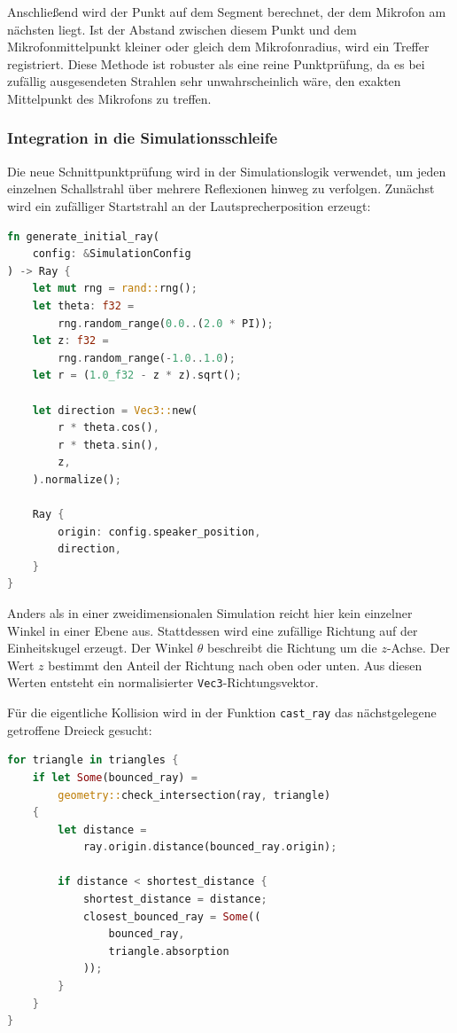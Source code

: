 Anschließend wird der Punkt auf dem Segment berechnet, der dem Mikrofon am
nächsten liegt. Ist der Abstand zwischen diesem Punkt und dem
Mikrofonmittelpunkt kleiner oder gleich dem Mikrofonradius, wird ein Treffer
registriert. Diese Methode ist robuster als eine reine Punktprüfung, da es bei
zufällig ausgesendeten Strahlen sehr unwahrscheinlich wäre, den exakten
Mittelpunkt des Mikrofons zu treffen.

\subsubsection{Integration in die Simulationsschleife}
\label{subsubsec:simulation_loop}

Die neue Schnittpunktprüfung wird in der Simulationslogik verwendet, um jeden
einzelnen Schallstrahl über mehrere Reflexionen hinweg zu verfolgen. Zunächst
wird ein zufälliger Startstrahl an der Lautsprecherposition erzeugt:

\begin{lstlisting}[language=Rust]
fn generate_initial_ray(
    config: &SimulationConfig
) -> Ray {
    let mut rng = rand::rng();
    let theta: f32 =
        rng.random_range(0.0..(2.0 * PI));
    let z: f32 =
        rng.random_range(-1.0..1.0);
    let r = (1.0_f32 - z * z).sqrt();

    let direction = Vec3::new(
        r * theta.cos(),
        r * theta.sin(),
        z,
    ).normalize();

    Ray {
        origin: config.speaker_position,
        direction,
    }
}
\end{lstlisting}

Anders als in einer zweidimensionalen Simulation reicht hier kein einzelner
Winkel in einer Ebene aus. Stattdessen wird eine zufällige Richtung auf der
Einheitskugel erzeugt. Der Winkel \(\theta\) beschreibt die Richtung um die
\(z\)-Achse. Der Wert \(z\) bestimmt den Anteil der Richtung nach oben oder
unten. Aus diesen Werten entsteht ein normalisierter
\texttt{Vec3}-Richtungsvektor.

Für die eigentliche Kollision wird in der Funktion \texttt{cast\_ray} das
nächstgelegene getroffene Dreieck gesucht:

\begin{lstlisting}[language=Rust]
for triangle in triangles {
    if let Some(bounced_ray) =
        geometry::check_intersection(ray, triangle)
    {
        let distance =
            ray.origin.distance(bounced_ray.origin);

        if distance < shortest_distance {
            shortest_distance = distance;
            closest_bounced_ray = Some((
                bounced_ray,
                triangle.absorption
            ));
        }
    }
}
\end{lstlisting}

